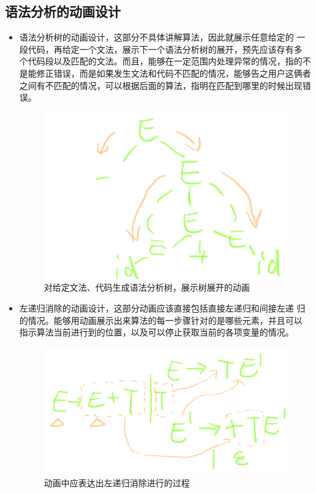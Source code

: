 \subsection{语法分析的动画设计}
\begin{itemize}
\item 语法分析树的动画设计，这部分不具体讲解算法，因此就展示任意给定的
  一段代码，再给定一个文法，展示下一个语法分析树的展开，预先应该存有多
  个代码段以及匹配的文法。而且，能够在一定范围内处理异常的情况，指的不
  是能修正错误，而是如果发生文法和代码不匹配的情况，能够告之用户这俩者
  之间有不匹配的情况，可以根据后面的算法，指明在匹配到哪里的时候出现错
  误。
          \begin{figure}[!htb]
          	\centering
          	\includegraphics[width=0.7\linewidth]{img/analyze.png}
          	\caption{对给定文法、代码生成语法分析树，展示树展开的动画}
          	\label{fig:analyze.png}
          \end{figure}
\item 左递归消除的动画设计，这部分动画应该直接包括直接左递归和间接左递
  归的情况。能够用动画展示出来算法的每一步骤针对的是哪些元素，并且可以
  指示算法当前进行到的位置，以及可以停止获取当前的各项变量的情况。
            \begin{figure}[!htb]
            	\centering
            	\includegraphics[width=0.7\linewidth]{img/leftrecursive.png}
            	\caption{动画中应表达出左递归消除进行的过程}
            	\label{fig:leftrecursive.png}

\end{figure}
\end{itemize}
